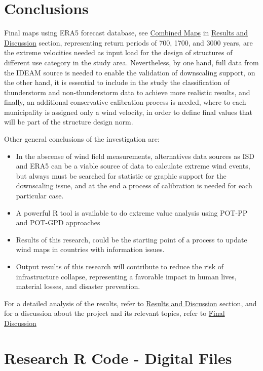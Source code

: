 \documentclass[12pt,oneside]{reedthesis}
\begin{document}
\hypertarget{conclusions}{%
\chapter{Conclusions}\label{conclusions}}

Final maps using ERA5 forecast database, see \protect\hyperlink{cm}{Combined Maps} in \protect\hyperlink{rmd-results}{Results and Discussion} section, representing return periods of 700, 1700, and 3000 years, are the extreme velocities needed as input load for the design of structures of different use category in the study area. Nevertheless, by one hand, full data from the IDEAM source is needed to enable the validation of downscaling support, on the other hand, it is essential to include in the study the classification of thunderstorm and non-thunderstorm data to achieve more realistic results, and finally, an additional conservative calibration process is needed, where to each municipality is assigned only a wind velocity, in order to define final values that will be part of the structure design norm.

Other general conclusions of the investigation are:
\begin{itemize}
\item
  In the abscense of wind field measurements, alternatives data sources as ISD and ERA5 can be a viable source of data to calculate extreme wind events, but always must be searched for statistic or graphic support for the downscaling issue, and at the end a process of calibration is needed for each particular case.
\item
  A powerful R tool is available to do extreme value analysis using POT-PP and POT-GPD approaches
\item
  Results of this research, could be the starting point of a process to update wind maps in countries with information issues.
\item
  Output results of this research will contribute to reduce the risk of infrastructure collapse, representing a favorable impact in human lives, material losses, and disaster prevention.
\end{itemize}
For a detailed analysis of the results, refer to \protect\hyperlink{rmd-results}{Results and Discussion} section, and for a discussion about the project and its relevant topics, refer to \protect\hyperlink{fd}{Final Discussion}

\appendix

\hypertarget{rcode}{%
\chapter{Research R Code - Digital Files}\label{rcode}}
\end{document}

